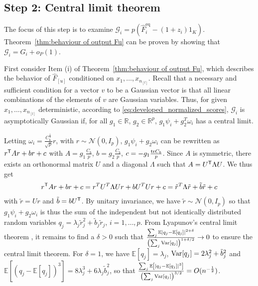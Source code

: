 \documentclass[twoside,11pt]{article}
\def\RR{\mathbb{R}}
\def\trans{{\sf T}}
\begin{document}
\subsection{Step 2: Central limit theorem}
The focus of this step is to examine $\mathcal{G}_i=p(\hat{F}_{i}^{\text{eq}}-(1+z_i)1_K)$. Theorem~\ref{thm:behaviour of output Fu} can be proven by showing that $\mathcal{G}_i=G_i+o_P(1)$.


First consider Item (i) of Theorem~\ref{thm:behaviour of output Fu}, which describes the behavior of $\hat{F}_{[u]}$ conditioned on $x_1,\ldots,x_{n_{[l]}}$. Recall that a necessary and sufficient condition for a vector $v$ to be a Gaussian vector is that all linear combinations of the elements of $v$ are Gaussian variables. Thus, for given $x_1,\ldots,x_{n_{[l]}}$ deterministic, according to \eqref{eq:developed_normalized_scores}, $\mathcal{G}_i$ is asymptotically Gaussian if, for all $g_1\in\RR$, $g_2\in\RR^{p}$, $g_1\psi_{i}+g_2^T\omega_{i}$ has a central limit. 

Letting $\omega_{i}=\frac{C_b^{\frac{1}{2}}}{\sqrt{p}}r$, with $r\sim \mathcal N( 0, I_p )$, $g_1\psi_{i}+g_2\omega_{i}$ can be rewritten as $r^\trans Ar+br+c$ with $A=g_1\frac{C_b}{p}$, $b=g_2\frac{C_b}{p}$, $c=-g_1\frac{{\rm tr} C_b}{p}$. Since $A$ is symmetric, there exists an orthonormal matrix $U$ and a diagonal $\Lambda$ such that $A=U^\trans\Lambda U$. We thus get 
\begin{align*}
	r^\trans Ar+br+c=r^TU^T\Lambda Ur+bU^TUr+c=\tilde{r}^T\Lambda\tilde{r}+\tilde{b}\tilde{r}+c
\end{align*}
with $\tilde{r}=Ur$ and $\tilde{b}=bU^\trans$. By unitary invariance, we have $\tilde{r}\sim \mathcal N( 0, I_p )$ so that $g_1\psi_{i}+g_2\omega_{i}$ is thus the sum of the independent but not identically distributed random variables $q_j=\lambda_j\tilde{r}_j^2+\tilde{b}_j\tilde{r}_j$, $i=1,\ldots,p$. From Lyapunov's central limit theorem \citep[Theorem~27.3]{billingsley2008probability}, it remains to find a $\delta>0$ such that $\frac{\sum_j \mathbb{E}|q_j-\mathbb{E}[q_j]|^{2+\delta}}{\left(\sum_{j}{\rm Var}[q_j]\right)^{1+\delta/2}}\to0$ to ensure the central limit theorem. For $\delta=1$, we have $\mathbb{E}[q_j]=\lambda_j$, ${\rm Var}[q_j]=2\lambda_j^2+\tilde{b}_j^2$ and $\mathbb{E}\left[(q_j-\mathbb{E}[q_j])^3\right]=8\lambda_j^3+6\lambda_j\tilde{b}_j^2$, so that $\frac{\sum_j \mathbb{E}\left[|q_j-\mathbb{E}[q_j]|^{3}\right]}{\left(\sum_{j}{\rm Var}[q_j]\right)^{3/2}}=O(n^{-\frac{1}{2}})$.
\end{document}
